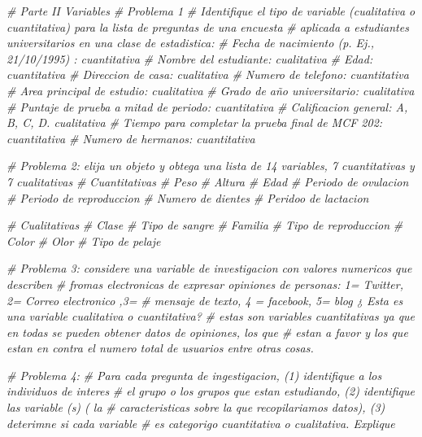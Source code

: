 \documentclass[
]{article}
\newenvironment{Shaded}{\begin{snugshade}}{\end{snugshade}}
\newcommand{\CommentTok}[1]{\textcolor[rgb]{0.56,0.35,0.01}{\textit{#1}}}
\begin{document}
\begin{Shaded}
\begin{Highlighting}[]
\CommentTok{\# Parte II Variables}
\CommentTok{\# Problema 1}
\CommentTok{\# Identifique el tipo de variable (cualitativa o cuantitativa) para la lista de preguntas de una encuesta }
\CommentTok{\# aplicada a estudiantes universitarios en una clase de estadistica:}
\CommentTok{\# Fecha de nacimiento (p. Ej., 21/10/1995) : cuantitativa}
\CommentTok{\# Nombre del estudiante: cualitativa}
\CommentTok{\# Edad: cuantitativa}
\CommentTok{\# Direccion de casa: cualitativa}
\CommentTok{\# Numero de telefono: cuantitativa}
\CommentTok{\# Area principal de estudio: cualitativa}
\CommentTok{\# Grado de año universitario: cualitativa}
\CommentTok{\# Puntaje de prueba a mitad de periodo: cuantitativa }
\CommentTok{\# Calificacion general: A, B, C, D. cualitativa}
\CommentTok{\# Tiempo para completar la prueba final de MCF 202: cuantitativa }
\CommentTok{\# Numero de hermanos: cuantitativa}

\CommentTok{\# Problema 2: elija un objeto y obtega una lista de 14 variables, 7 cuantitativas y 7 cualitativas}
\CommentTok{\# Cuantitativas}
\CommentTok{\# Peso}
\CommentTok{\# Altura}
\CommentTok{\# Edad}
\CommentTok{\# Periodo de ovulacion}
\CommentTok{\# Periodo de reproduccion}
\CommentTok{\# Numero de dientes}
\CommentTok{\# Peridoo de lactacion}

\CommentTok{\# Cualitativas}
\CommentTok{\# Clase}
\CommentTok{\# Tipo de sangre}
\CommentTok{\# Familia}
\CommentTok{\# Tipo de reproduccion}
\CommentTok{\# Color}
\CommentTok{\# Olor}
\CommentTok{\# Tipo de pelaje}

\CommentTok{\# Problema 3: considere una variable de investigacion con valores numericos que describen }
\CommentTok{\# fromas electronicas de expresar opiniones de personas: 1= Twitter, 2= Correo electronico ,3= }
\CommentTok{\# mensaje de texto, 4 = facebook, 5= blog ¿ Esta es una variable cualitativa o cuantitativa? }
\CommentTok{\# estas son variables cuantitativas ya que en todas se pueden obtener datos de opiniones, los que }
\CommentTok{\# estan a favor y los que estan en contra el numero total de usuarios entre otras cosas.}

\CommentTok{\# Problema 4: }
\CommentTok{\# Para cada pregunta de ingestigacion, (1) identifique a los individuos de interes}
\CommentTok{\# el grupo o los grupos que estan estudiando, (2) identifique las variable (s) ( la}
\CommentTok{\# caracteristicas sobre la que recopilariamos datos), (3) deterimne si cada variable}
\CommentTok{\# es categorigo cuantitativa  o cualitativa. Explique}


\end{Highlighting}
\end{Shaded}
\end{document}
